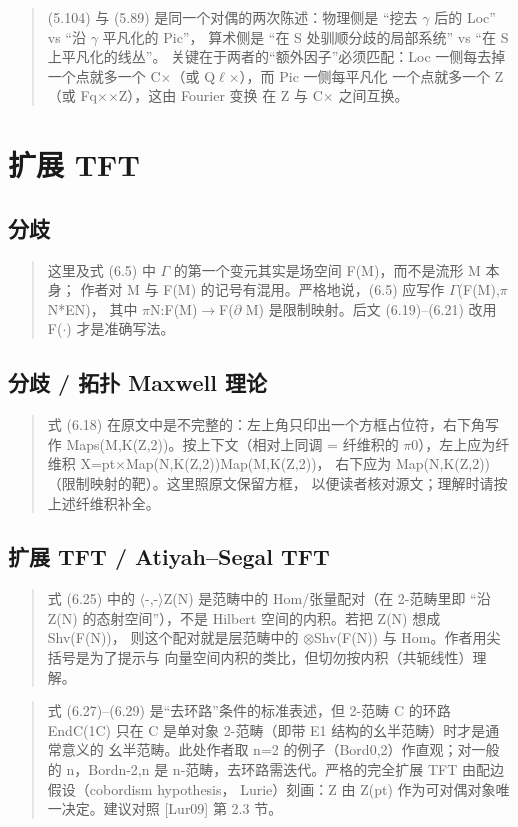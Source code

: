 \begin{quote}\small
(5.104) 与 (5.89) 是同一个对偶的两次陈述：物理侧是 “挖去 $\gamma$ 后的 Loc” vs “沿 $\gamma$ 平凡化的 Pic”， 算术侧是 “在 S 处驯顺分歧的局部系统” vs “在 S 上平凡化的线丛”。 关键在于两者的“额外因子”必须匹配：Loc 一侧每去掉一个点就多一个 C$\times$（或 Q$\ell$$\times$），而 Pic 一侧每平凡化 一个点就多一个 Z（或 Fq$\times$$\times$Z），这由 Fourier 变换 在 Z 与 C$\times$ 之间互换。
\end{quote}

\section{扩展 TFT}
\subsection*{分歧}
\begin{quote}\small
这里及式 (6.5) 中 $\Gamma$ 的第一个变元其实是场空间 F(M)，而不是流形 M 本身； 作者对 M 与 F(M) 的记号有混用。严格地说，(6.5) 应写作 $\Gamma$(F(M),$\pi$N*EN)， 其中 $\pi$N:F(M)$\to$F($\partial$ M) 是限制映射。后文 (6.19)--(6.21) 改用 F($\cdot$) 才是准确写法。
\end{quote}

\subsection*{分歧 / 拓扑 Maxwell 理论}
\begin{quote}\small
式 (6.18) 在原文中是不完整的：左上角只印出一个方框占位符，右下角写作 Maps(M,K(Z,2))。按上下文（相对上同调 = 纤维积的 $\pi$0），左上应为纤维积 X=pt$\times$Map(N,K(Z,2))Map(M,K(Z,2))， 右下应为 Map(N,K(Z,2))（限制映射的靶）。这里照原文保留方框， 以便读者核对源文；理解时请按上述纤维积补全。
\end{quote}

\subsection*{扩展 TFT / Atiyah--Segal TFT}
\begin{quote}\small
式 (6.25) 中的 $\langle$-,-$\rangle$Z(N) 是范畴中的 Hom/张量配对（在 2-范畴里即 “沿 Z(N) 的态射空间”），不是 Hilbert 空间的内积。若把 Z(N) 想成 Shv(F(N))， 则这个配对就是层范畴中的 $\otimes$Shv(F(N)) 与 Hom。作者用尖括号是为了提示与 向量空间内积的类比，但切勿按内积（共轭线性）理解。
\end{quote}

\begin{quote}\small
式 (6.27)--(6.29) 是“去环路”条件的标准表述，但 2-范畴 C 的环路 EndC(1C) 只在 C 是单对象 2-范畴（即带 E1 结构的幺半范畴）时才是通常意义的 幺半范畴。此处作者取 n=2 的例子（Bord0,2）作直观；对一般的 n，Bordn-2,n 是 n-范畴，去环路需迭代。严格的完全扩展 TFT 由配边假设（cobordism hypothesis， Lurie）刻画：Z 由 Z(pt) 作为可对偶对象唯一决定。建议对照 [Lur09] 第 2.3 节。
\end{quote}

